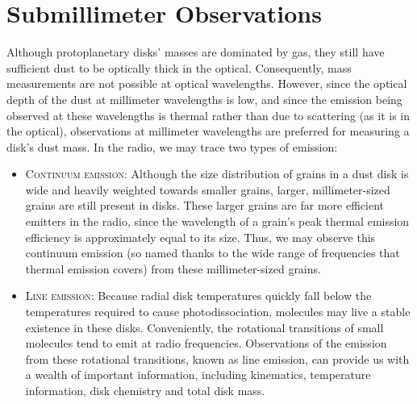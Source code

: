 \section{Submillimeter Observations}

Although protoplanetary disks' masses are dominated by gas, they still have sufficient dust to be optically thick in the optical. Consequently, mass measurements are not possible at optical wavelengths. However, since the optical depth of the dust at millimeter wavelengths is low, and since the emission being observed at these wavelengths is thermal rather than due to scattering (as it is in the optical), observations at millimeter wavelengths are preferred for measuring a disk's dust mass. In the radio, we may trace two types of emission:

\begin{itemize}


  \item \textsc{Continuum emission}: Although the size distribution of grains in a dust disk is wide and heavily weighted towards smaller grains, larger, millimeter-sized grains are still present in disks. These larger grains are far more efficient emitters in the radio, since the wavelength of a grain's peak thermal emission efficiency is approximately equal to its size. Thus, we may observe this continuum emission (so named thanks to the wide range of frequencies that thermal emission covers) from these millimeter-sized grains.


  \item \textsc{Line emission}: Because radial disk temperatures quickly fall below the temperatures required to cause photodissociation, molecules may live a stable existence in these disks. Conveniently, the rotational transitions of small molecules tend to emit at radio frequencies. Observations of the emission from these rotational transitions, known as line emission, can provide us with a wealth of important information, including kinematics, temperature information, disk chemistry and total disk mass.
\end{itemize}


